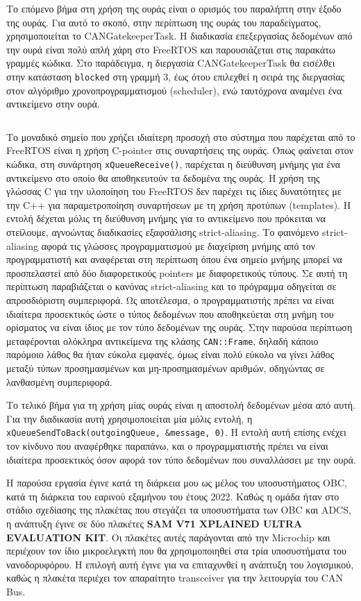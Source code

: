 \documentclass[a4paper,nobib,justified]{tufte-book}
\begin{document}
Το επόμενο βήμα στη χρήση της ουράς είναι ο ορισμός του παραλήπτη στην έξοδο της ουράς. Για αυτό το σκοπό, στην περίπτωση της ουράς του παραδείγματος, χρησιμοποιείται το CANGatekeeperTask. Η διαδικασία επεξεργασίας δεδομένων από την ουρά είναι πολύ απλή χάρη στο FreeRTOS και παρουσιάζεται στις παρακάτω γραμμές κώδικα. Στο παράδειγμα, η διεργασία CANGatekeeperTask θα εισέλθει στην κατάσταση \texttt{blocked} στη γραμμή 3, έως ότου επιλεχθεί η σειρά της διεργασίας στον αλγόριθμο χρονοπρογραμματισμού (scheduler), ενώ ταυτόχρονα αναμένει ένα αντικείμενο στην ουρά.
\inputminted{c++}{code/examples/gatekeeper-execute-short.cpp}

Το μοναδικό σημείο που χρήζει ιδιαίτερη προσοχή στο σύστημα που παρέχεται από το FreeRTOS είναι η χρήση C-pointer στις συναρτήσεις της ουράς. Όπως φαίνεται στον κώδικα, στη συνάρτηση \texttt{xQueueReceive()}, παρέχεται η διεύθυνση μνήμης για ένα αντικείμενο στο οποίο θα αποθηκευτούν τα δεδομένα της ουράς. Η χρήση της γλώσσας C για την υλοποίηση του FreeRTOS δεν παρέχει τις ίδιες δυνατότητες με την C++ για παραμετροποίηση συναρτήσεων με τη χρήση προτύπων (templates). Η εντολή δέχεται μόλις τη διεύθυνση μνήμης για το αντικείμενο που πρόκειται να στείλουμε, αγνοώντας διαδικασίες εξαφσάλισης strict-aliasing. Το φαινόμενο strict-aliasing αφορά τις γλώσσες προγραμματισμού με διαχείριση μνήμης από τον προγραμματιστή και αναφέρεται στη περίπτωση όπου ένα σημείο μνήμης μπορεί να προσπελαστεί από δύο διαφορετικούς pointers με διαφορετικούς τύπους. Σε αυτή τη περίπτωση παραβιάζεται ο κανόνας strict-aliasing και το πρόγραμμα οδηγείται σε απροσδιόριστη συμπεριφορά. Ως αποτέλεσμα, ο προγραμματιστής πρέπει να είναι ιδιαίτερα προσεκτικός ώστε ο τύπος δεδομένων που αποθηκεύεται στη μνήμη του ορίσματος να είναι ίδιος με τον τύπο δεδομένων της ουράς. Στην παρούσα περίπτωση μεταφέρονται ολόκληρα αντικείμενα της κλάσης \texttt{CAN::Frame}, δηλαδή κάποιο παρόμοιο λάθος θα ήταν εύκολα εμφανές, όμως είναι πολύ εύκολο να γίνει λάθος μεταξύ τύπων προσημασμένων και μη-προσημασμένων αριθμών, οδηγώντας σε λανθασμένη συμπεριφορά.

Το τελικό βήμα για τη χρήση μίας ουράς είναι η αποστολή δεδομένων μέσα από αυτή. Για την διαδικασία αυτή χρησιμοποιείται μία μόλις εντολή, η \texttt{xQueueSendToBack(outgoingQueue, \&message, 0)}. Η εντολή αυτή επίσης ενέχει τον κίνδυνο που αναφέρθηκε παραπάνω, και ο προγραμματιστής πρέπει να είναι ιδιαίτερα προσεκτικός όσον αφορά τον τύπο δεδομένων που συναλλάσσει με την ουρά. 

Η παρούσα εργασία έγινε κατά τη διάρκεια μου ως μέλος του υποσυστήματος OBC, κατά τη διάρκεια του εαρινού εξαμήνου του έτους 2022. Καθώς η ομάδα ήταν στο στάδιο σχεδίασης της πλακέτας που στεγάζει τα υποσυστήματα των OBC και ADCS, η ανάπτυξη έγινε σε δύο πλακέτες \textbf{SAM V71 XPLAINED ULTRA EVALUATION KIT}. Οι πλακέτες αυτές παράγονται από την Microchip και περιέχουν τον ίδιο μικροελεγκτή που θα χρησιμοποιηθεί στα τρία υποσυστήματα του νανοδορυφόρου. Η επιλογή αυτή έγινε για να επιταχυνθεί η ανάπτυξη του λογισμικού, καθώς η πλακέτα περιέχει τον απαραίτητο transceiver για την λειτουργία του CAN Bus. 
\end{document}

